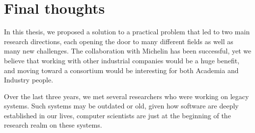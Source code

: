 \section{Final thoughts}
\label{sec:conclusion:final-thoughts}

In this thesis, we proposed a solution to a practical problem
that led to two main research directions, each opening the door
to many different fields as well as many new challenges. The
collaboration with Michelin has been successful, yet we believe
that working with other industrial companies would be a huge
benefit, and moving toward a consortium would be interesting for
both Academia and Industry people.

Over the last three years, we met several researchers who were
working on legacy systems. Such systems may be outdated or old,
given how software are deeply established in our lives, computer
scientists are just at the beginning of the research realm on
these systems.
